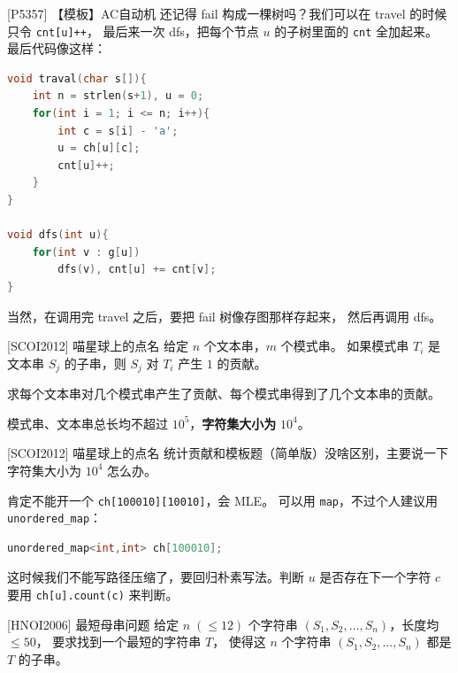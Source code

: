 \documentclass{beamer}
\begin{document}
\begin{frame}[fragile]{[P5357] 【模板】AC自动机}
    \footnotesize
    还记得 fail 构成一棵树吗？我们可以在 travel 的时候只令 \verb|cnt[u]++|，
    最后来一次 dfs，把每个节点 $u$ 的子树里面的 \verb|cnt| 全加起来。
    最后代码像这样：

    \begin{lstlisting}[language=c++]
void traval(char s[]){
    int n = strlen(s+1), u = 0;
    for(int i = 1; i <= n; i++){
        int c = s[i] - 'a';
        u = ch[u][c];
        cnt[u]++;
    }
}

void dfs(int u){
    for(int v : g[u])
        dfs(v), cnt[u] += cnt[v];
}
    \end{lstlisting}

    \pause
    当然，在调用完 travel 之后，要把 fail 树像存图那样存起来，
    然后再调用 dfs。
\end{frame}

\begin{frame}[fragile]{[SCOI2012] 喵星球上的点名}
    \footnotesize
    给定 $n$ 个文本串，$m$ 个模式串。
    如果模式串 $T_i$ 是文本串 $S_j$ 的子串，则 $S_j$ 对 $T_i$ 产生 $1$ 的贡献。

    \vspace{1em}
    求每个文本串对几个模式串产生了贡献、每个模式串得到了几个文本串的贡献。

    \vspace{1em}
    模式串、文本串总长均不超过 $10^5$，\textbf{字符集大小为} $10^4$。
\end{frame}

\begin{frame}[fragile]{[SCOI2012] 喵星球上的点名}
    \footnotesize
    统计贡献和模板题（简单版）没啥区别，主要说一下字符集大小为 $10^4$ 怎么办。

    \vspace{1em}\pause
    肯定不能开一个 \verb|ch[100010][10010]|，会 MLE。
    可以用 \verb|map|，不过个人建议用 \verb|unordered_map|：
    \begin{lstlisting}[language=c++]
unordered_map<int,int> ch[100010];
    \end{lstlisting}

    \vspace{1em}\pause
    这时候我们不能写路径压缩了，要回归朴素写法。判断 $u$ 是否存在下一个字符 $c$
    要用 \verb|ch[u].count(c)| 来判断。
\end{frame}

\begin{frame}[fragile]{[HNOI2006] 最短母串问题}
    \footnotesize
    给定  $n\;(\leq 12)$ 个字符串  $(S_1,S_2,...,S_n)$，长度均 $\leq 50$，
    要求找到一个最短的字符串  $T$，
    使得这  $n$ 个字符串  $(S_1,S_2,...,S_n)$ 都是  $T$ 的子串。
\end{frame}
\end{document}

